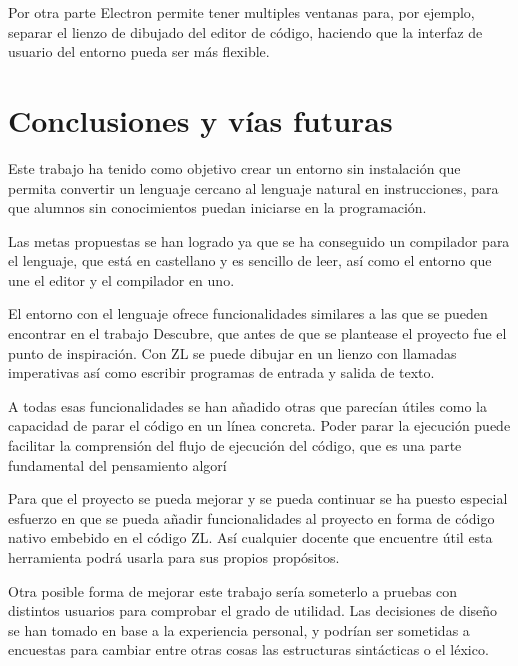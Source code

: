 \documentclass{report}
\begin{document}
	\vspace{10px}
	
	Por otra parte Electron permite tener multiples ventanas para, por ejemplo, separar el lienzo de dibujado del editor de código, haciendo que la interfaz de usuario del entorno pueda ser más flexible. 
	
	\chapter{Conclusiones y vías futuras}
	
	Este trabajo ha tenido como objetivo crear un entorno sin instalación que permita convertir un lenguaje cercano al lenguaje natural en instrucciones, para que alumnos sin conocimientos puedan iniciarse en la programación. 
	
	Las metas propuestas se han logrado ya que se ha conseguido un compilador para el lenguaje, que está en castellano y es sencillo de leer, así como el entorno que une el editor y el compilador en uno. 
	
	El entorno con el lenguaje ofrece funcionalidades similares a las que se pueden encontrar en el trabajo Descubre, que antes de que se plantease el proyecto fue el punto de inspiración. Con ZL se puede dibujar en un lienzo con llamadas imperativas así como escribir programas de entrada y salida de texto. 
	
	A todas esas funcionalidades se han añadido otras que parecían útiles como la capacidad de parar el código en un línea concreta. Poder parar la ejecución puede facilitar la comprensión del flujo de ejecución del código, que es una parte fundamental del pensamiento algorí 
	
	Para que el proyecto se pueda mejorar y se pueda continuar se ha puesto especial esfuerzo en que se pueda añadir funcionalidades al proyecto en forma de código nativo embebido en el código ZL. Así cualquier docente que encuentre útil esta herramienta podrá usarla para sus propios propósitos. 
	
	Otra posible forma de mejorar este trabajo sería someterlo a pruebas con distintos usuarios para comprobar el grado de utilidad. Las decisiones de diseño se han tomado en base a la experiencia personal, y podrían ser sometidas a encuestas para cambiar entre otras cosas las estructuras sintácticas o el léxico. 
	 
	
	 
	
	

	\appendix
\end{document}
